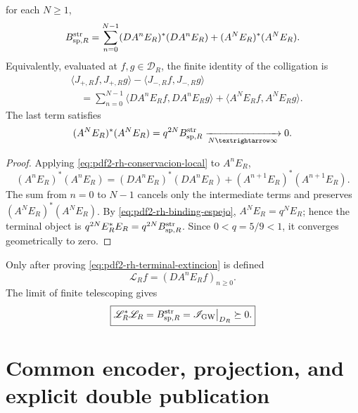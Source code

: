 \begin{proposition}
\label{prop:pdf2-rh-telescopia}
for each \(N\geq1\),
\begin{equation}\label{eq:pdf2-rh-telescopia-finita}
 \mathcal B_{{\rm sp},R}^{\rm str}
 =\sum_{n=0}^{N-1}(DA^nE_R)^*(DA^nE_R)
 +(A^NE_R)^*(A^NE_R).
\end{equation}
Equivalently, evaluated at \(f,g\in\mathcal D_R\), the finite identity of
the colligation is
\begin{equation}\label{eq:pdf2-rh-balance-finito-columnas}
\boxed{
\begin{aligned}
 &\langle J_{+,R}f,J_{+,R}g\rangle
  -\langle J_{-,R}f,J_{-,R}g\rangle\\
 &\quad=\sum_{n=0}^{N-1}
  \langle DA^nE_Rf,DA^nE_Rg\rangle
  +\langle A^NE_Rf,A^NE_Rg\rangle.
\end{aligned}}
\end{equation}
The last term satisfies
\begin{equation}\label{eq:pdf2-rh-terminal-extincion}
 (A^NE_R)^*(A^NE_R)
 =q^{2N}\mathcal B_{{\rm sp},R}^{\rm str}
 \xrightarrow[N\to\infty]{}0.
\end{equation}
\end{proposition}

\begin{proof}
Applying \eqref{eq:pdf2-rh-conservacion-local} to \(A^nE_R\),
\[
 (A^nE_R)^*(A^nE_R)
 =(DA^nE_R)^*(DA^nE_R)
 +(A^{n+1}E_R)^*(A^{n+1}E_R).
\]
The sum from \(n=0\) to \(N-1\) cancels only the intermediate terms and
preserves \((A^NE_R)^*(A^NE_R)\). By
\eqref{eq:pdf2-rh-binding-espejo}, \(A^NE_R=q^NE_R\); hence the terminal object
is \(q^{2N}E_R^*E_R=q^{2N}\mathcal B_{{\rm sp},R}^{\rm str}\). Since
\(0<q=5/9<1\), it converges geometrically to zero.
\end{proof}

Only after proving \eqref{eq:pdf2-rh-terminal-extincion} is defined
\begin{equation}\label{eq:pdf2-rh-l-r}
 \mathscr L_Rf=(DA^nE_Rf)_{n\geq0}.
\end{equation}
The limit of finite telescoping gives
\begin{equation}\label{eq:pdf2-rh-lstar-l}
 \boxed{
 \mathscr L_R^*\mathscr L_R
 =\mathcal B_{{\rm sp},R}^{\rm str}
 =\mathscr I_{\rm GW}\big|_{\mathcal D_R}\succeq0.}
\end{equation}

\section{Common encoder, projection, and explicit double publication}

